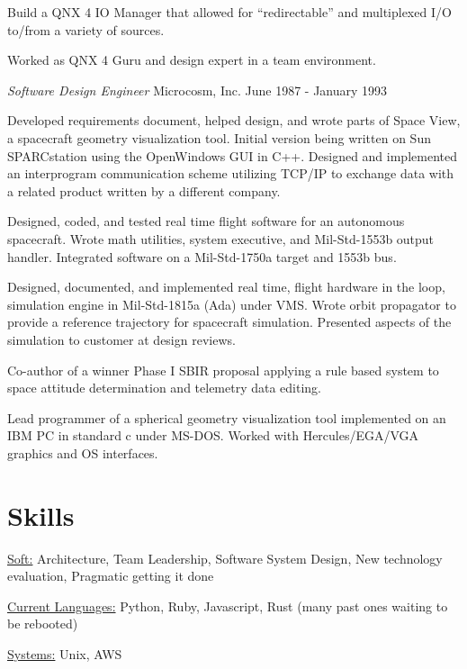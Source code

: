 \documentclass[margin]{res}
\begin{document}
\begin{resume}
                Build a QNX 4 IO Manager that allowed for
                “redirectable” and multiplexed I/O to/from a variety
                of sources.

                Worked as QNX 4 Guru and design expert in a team
                environment.

                {\sl\large Software Design Engineer } Microcosm, Inc. \hfill June 1987 - January 1993

                Developed requirements document, helped design, and wrote
                parts of Space View, a spacecraft geometry visualization
                tool. Initial version being written on Sun SPARCstation
                using the OpenWindows GUI in C++. Designed and implemented
                an interprogram communication scheme utilizing TCP/IP
                to exchange data with a related product written by a
                different company.

                Designed, coded, and tested real time flight software for
                an autonomous spacecraft. Wrote math utilities, system
                executive, and Mil-Std-1553b output handler. Integrated
                software on a Mil-Std-1750a target and 1553b bus.

                Designed, documented, and implemented real time, flight
                hardware in the loop, simulation engine in Mil-Std-1815a
                (Ada) under VMS. Wrote orbit propagator to provide a
                reference trajectory for spacecraft simulation. Presented
                aspects of the simulation to customer at design reviews.

                Co-author of a winner Phase I SBIR proposal applying a
                rule based system to space attitude determination and
                telemetry data editing.

                Lead programmer of a spherical geometry visualization
                tool implemented on an IBM PC in standard c under
                MS-DOS. Worked with Hercules/EGA/VGA graphics and OS
                interfaces.

    \section{Skills}
        \underline{Soft:} Architecture, Team Leadership, Software System Design, New technology evaluation,
        Pragmatic getting it done

        \underline{Current Languages:} Python, Ruby, Javascript, Rust (many past ones waiting to be rebooted)

        \underline{Systems:} Unix, AWS

\end{resume}
\end{document}
